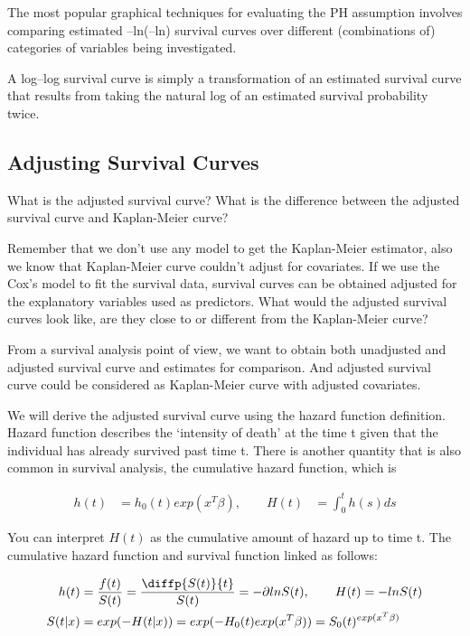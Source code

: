 \documentclass[11pt]{article} %
\begin{document}
The most popular graphical techniques for evaluating the PH assumption involves comparing estimated –ln(–ln) survival curves over different (combinations of) categories of variables being investigated.

A log–log survival curve is simply a transformation of an estimated survival curve that results from taking the natural log of an estimated survival probability twice.

\subsection{Adjusting Survival Curves}

What is the adjusted survival curve? What is the difference between the adjusted survival curve and Kaplan-Meier curve?

Remember that we don't use any model to get the Kaplan-Meier estimator, also we know that Kaplan-Meier curve couldn't adjust for covariates. If we use the Cox's model to fit the survival data, survival curves can be obtained adjusted for the explanatory variables used as predictors. What would the adjusted survival curves look like, are they close to or different from the Kaplan-Meier curve?

From a survival analysis point of view, we want to obtain both unadjusted and adjusted survival curve and estimates for comparison. And adjusted survival curve could be considered as Kaplan-Meier curve with adjusted covariates.


We will derive the adjusted survival curve using the hazard function definition. Hazard function describes the `intensity of death' at the time t given that the individual has already survived past time t. There is another quantity that is also common in survival analysis, the cumulative hazard function, which is

\begin{align*}
	h(t) &= h_0(t) exp(x^T \beta), \qquad H(t) &= \int_{0}^t h(s) ds
\end{align*}

You can interpret $H(t)$ as the cumulative amount of hazard up to time t. The cumulative hazard function and survival function linked as follows:

\begin{align*}
	h(t) &= \frac{f(t)}{S(t)} = \frac{\diffp{S(t)}{t}}{S(t)} =  - \partial ln S(t), \qquad    H(t) = -ln S(t)\\
	S(t|x) &= exp(-H(t|x)) = exp(-H_0(t) exp(x^T \beta)) = S_0(t)^{exp(x^T \beta)}
\end{align*}
\end{document}
